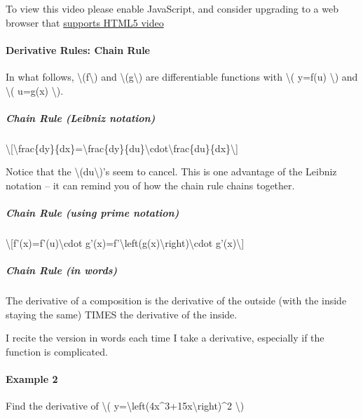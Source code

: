 To view this video please enable JavaScript, and consider upgrading to a
web browser that \href{http://videojs.com/html5-video-support/}{supports
HTML5 video}

\hypertarget{derivative-rules-chain-rule}{%
\paragraph{Derivative Rules: Chain
Rule}\label{derivative-rules-chain-rule}}

In what follows, \textbackslash{}(f\textbackslash{}) and
\textbackslash{}(g\textbackslash{}) are differentiable functions with
\textbackslash{}( y=f(u) \textbackslash{}) and \textbackslash{}( u=g(x)
\textbackslash{}).

\hypertarget{chain-rule-leibniz-notation}{%
\subparagraph{Chain Rule (Leibniz
notation)}\label{chain-rule-leibniz-notation}}

\textbackslash{}{[}\textbackslash{}frac\{dy\}\{dx\}=\textbackslash{}frac\{dy\}\{du\}\textbackslash{}cdot\textbackslash{}frac\{du\}\{dx\}\textbackslash{}{]}

Notice that the \textbackslash{}(du\textbackslash{})'s seem to cancel.
This is one advantage of the Leibniz notation -- it can remind you of
how the chain rule chains together.

\hypertarget{chain-rule-using-prime-notation}{%
\subparagraph{Chain Rule (using prime
notation)}\label{chain-rule-using-prime-notation}}

\textbackslash{}{[}f'(x)=f'(u)\textbackslash{}cdot
g'(x)=f'\textbackslash{}left(g(x)\textbackslash{}right)\textbackslash{}cdot
g'(x)\textbackslash{}{]}

\hypertarget{chain-rule-in-words}{%
\subparagraph{Chain Rule (in words)}\label{chain-rule-in-words}}

The derivative of a composition is the derivative of the outside (with
the inside staying the same) TIMES the derivative of the inside.

I recite the version in words each time I take a derivative, especially
if the function is complicated.

\hypertarget{example-2}{%
\paragraph{Example 2}\label{example-2}}

Find the derivative of \textbackslash{}(
y=\textbackslash{}left(4x\^{}3+15x\textbackslash{}right)\^{}2
\textbackslash{})

